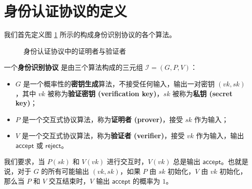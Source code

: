 \section{身份认证协议的定义}


我们首先定义图 \ref{fig:18—1} 所示的构成身份识别协议的各个算法。

\begin{figure}
    \centering
    
    \caption{身份认证协议中的证明者与验证者}
    \label{fig:18—1}
\end{figure}

\begin{definition}
一个\textbf{身份识别协议} 是由三个算法构成的三元组 $\mathcal{I}=(G,P,V)$：
\begin{itemize}
    \item $G$ 是一个概率性的\textbf{密钥生成}算法，不接受任何输入，输出一对密钥 $(vk,sk)$，其中 $vk$ 被称为\textbf{验证密钥 (verification key)}，$sk$ 被称为\textbf{私钥 (secret key)}；
    \item $P$ 是一个交互式协议算法，称为\textbf{证明者 (prover)}，接受 $sk$ 作为输入；
    \item $V$ 是一个交互式协议算法，称为\textbf{验证者 (verifier)}，接受 $vk$ 作为输入，输出 $\mathsf{accept}$ 或 $\mathsf{reject}$。
\end{itemize}
我们要求，当 $P(sk)$ 和 $V(vk)$ 进行交互时，$V(vk)$ 总是输出 $\mathsf{accept}$。也就是说，对于 $G$ 的所有可能输出 $(vk,sk)$，如果 $P$ 由 $sk$ 初始化，$V$ 由 $vk$ 初始化，那么当 $P$ 和 $V$ 交互结束时，$V$ 输出 $\mathsf{accept}$ 的概率为 $1$。

\end{definition}